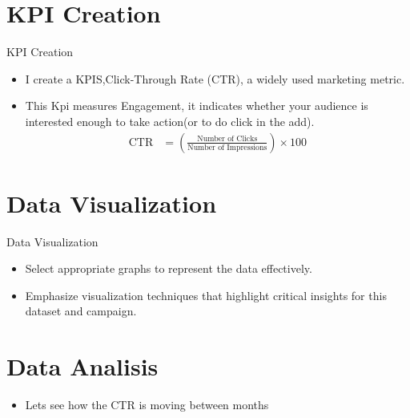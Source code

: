 \documentclass{beamer}
\begin{document}
	
	\section{KPI Creation}
	\begin{frame}{KPI Creation}
		\begin{itemize}
			\item I create a KPIS,Click-Through Rate (CTR), a widely used marketing metric.
			\item This Kpi measures Engagement, it indicates whether your audience is interested enough to take action(or to do click in the add).
			\begin{align*}
				\text{CTR} & = \left(\frac{\text{Number of Clicks}}{\text{Number of Impressions}}\right) \times 100
			\end{align*}
		\end{itemize}
	\end{frame}
	
	\section{Data Visualization}
	\begin{frame}{Data Visualization}
		\begin{itemize}
			\item Select appropriate graphs to represent the data effectively.
			\item Emphasize visualization techniques that highlight critical insights for this dataset and campaign.
		\end{itemize}
	\end{frame}

\section{Data Analisis}
\begin{frame}
	\begin{itemize}
		\item Lets see how the CTR is moving between months
		
	\end{itemize}
\end{frame}
	
	
\end{document}
